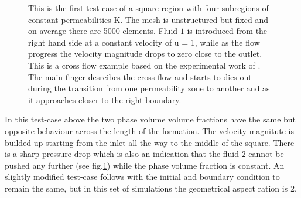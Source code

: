 \documentclass[preprint,authoryear,12pt]{elsarticle}
\begin{document}
\begin{figure}[h]
\begin{center}
\caption{This is the first test-case of a square region with four subregions of constant permeabilities K. The mesh is unstructured but fixed and on average there are 5000 elements. Fluid $1$ is introduced from the right hand side at a constant velocity of u = 1, while as the flow progress the velocity magnitude drops to zero close to the outlet. This is a cross flow example based on the experimental work of \citet{evans_1994}. The main finger desrcibes the cross flow and starts to dies out during the transition from one permeability zone to another and as it approaches closer to the right boundary.}
\label{fig:square}
\end{center}
\end{figure}

In this test-case above the two phase volume volume fractions have the same but opposite behaviour across the length of the formation. The velocity magnitute is builded up starting from the inlet all the way to the middle of the square. There is a sharp pressure drop which is also an indication that the fluid 2 cannot be pushed any further (see fig.\ref{fig:square}) while the phase volume fraction is constant. An slightly modified test-case follows with the initial and boundary condition to remain the same, but in this set of simulations the geometrical aspect ration is $2$.
\end{document}
